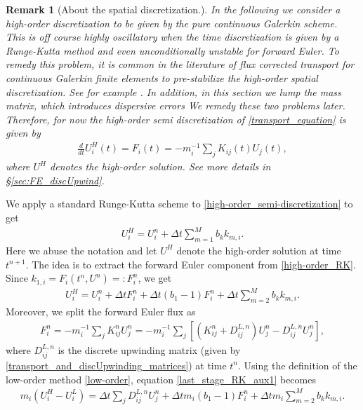 \documentclass{article}
\newtheorem{remark}{Remark}
\numberwithin{remark}{subsection}
\begin{document}
\begin{remark}[About the spatial discretization.]
  In the following we consider a high-order discretization to be given by the pure
  continuous Galerkin scheme. This is off course highly oscillatory when the time discretization
  is given by a Runge-Kutta method and even unconditionally unstable for forward Euler.
  To remedy this problem, it is common in the literature of flux corrected transport
  for continuous Galerkin finite elements to pre-stabilize the high-order spatial discretization.
  See for example \cite{lohmann2017flux,guermond2014second}.
  In addition, in this section we lump the mass matrix, 
  which introduces dispersive errors \cite{guermond2017effect}
  We remedy these two problems later.
  Therefore, for now the high-order semi discretization of \eqref{transport_equation} is given by
  \begin{align}\label{high-order_semi-discretization}
    \frac{d}{dt}U_i^H(t)=F_i(t)=-m_i^{-1}\sum_j K_{ij}(t) U_j(t),
  \end{align}
  where $U^H$ denotes the high-order solution. See more details in \S\ref{sec:FE_discUpwind}.
\end{remark}

We apply a standard Runge-Kutta scheme to \eqref{high-order_semi-discretization} to get
\begin{align}\label{high-order_RK}
  U_i^H=U_i^n+\Delta t\sum_{m=1}^M b_k k_{m,i}.
\end{align}
Here we abuse the notation and let $U^H$ denote the high-order solution at time $t^{n+1}$.
The idea is to extract the forward Euler component from \eqref{high-order_RK}.
Since $k_{1,i} = F_i(t^n,U^n)=:F_i^n$, we get 
\begin{align}\label{last_stage_RK_aux1}
  U_i^H=U_i^n+\Delta t F^n_i + \Delta t (b_1-1)F^n_i + \Delta t \sum_{m=2}^M b_k k_{m,i}.
\end{align}
Moreover, we split the forward Euler flux as
\begin{align*}
  F_i^n=-m_i^{-1}\sum_j K^n_{ij}U_j^n = -m_i^{-1}\sum_j \left[(K^n_{ij}+D_{ij}^{L,n})U_j^n - D_{ij}^{L,n}U_j^n\right],
\end{align*}
where $D_{ij}^{L,n}$ is the discrete upwinding matrix
(given by \eqref{transport_and_discUpwinding_matrices}) at time $t^n$. 
Using the definition of the low-order method \eqref{low-order},
equation \eqref{last_stage_RK_aux1} becomes
\begin{align}\label{last_stage_RK_aux2}
  m_i(U_i^H-U_i^L) = \Delta t \sum_j D_{ij}^{L,n} U_j^n +
  \Delta t m_i (b_1-1)F^n_i + \Delta t m_i\sum_{m=2}^M b_k k_{m,i}.
\end{align}
\end{document}
